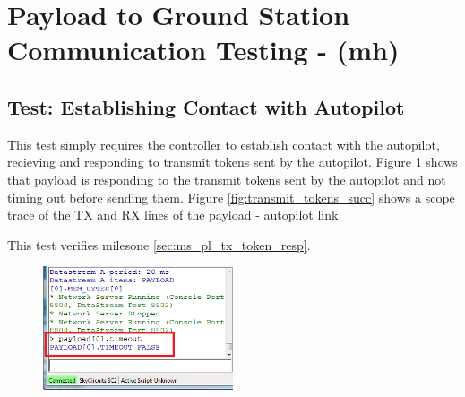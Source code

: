
\section{Payload to Ground Station Communication Testing - (mh)}

\subsection{Test: Establishing Contact with Autopilot}
\label{sec:test_pl_est_contact}
This test simply requires the controller to establish contact with the autopilot, recieving and responding to
transmit tokens sent by the autopilot. Figure \ref{fig:pl_comms_timeout_false} shows that payload is responding
to the transmit tokens sent by the autopilot and not timing out before sending them. Figure \ref{fig:transmit_tokens_succ}
shows a scope trace of the TX and RX lines of the payload - autopilot link

This test verifies milesone \ref{sec:ms_pl_tx_token_resp}.

\begin{figure}[H]
        \centering
        \includegraphics[width=0.5\textwidth]{testing_screenshots/timeout_false.png}
        \label{fig:pl_comms_timeout_false}
\end{figure}


